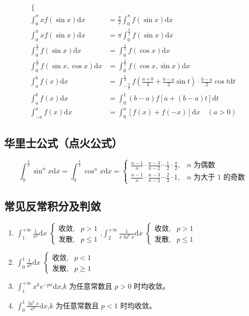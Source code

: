 \documentclass[UTF8]{ctexart}
\theoremstyle{remark}
\begin{document}
\begin{align}
\begin{cases}
			\end{cases}\\
			\int_{0}^{\pi} x f(\sin x)\mathrm{d}x&=\frac{\pi}{2}\int_{0}^{\pi} f(\sin x)\mathrm{d}x\\
			\int_{0}^{\pi} x f(\sin x)\mathrm{d}x&=\pi\int_{0}^{\frac{\pi}{2}} f(\sin x)\mathrm{d}x\\
			\int_{0}^{\frac{\pi}{2}} f(\sin x)\mathrm{d}x&=\int_{0}^{\frac{\pi}{2}} f(\cos x)\mathrm{d}x\\
			\int_{0}^{\frac{\pi}{2}} f(\sin x, \cos x)\mathrm{d}x&=\int_{0}^{\frac{\pi}{2}} f(\cos x, \sin x)\mathrm{d}x\\
			\int_{a}^{b} f(x)\mathrm{d}x&=\int_{-\frac{\pi}{2}}^{\frac{\pi}{2}} f\left(\frac{a + b}{2}+\frac{b - a}{2}\sin t\right)\cdot\frac{b - a}{2}\cos t\mathrm{d}t\\
			\int_{a}^{b} f(x)\mathrm{d}x&=\int_{0}^{1} (b - a)f[a+(b - a)t]\mathrm{d}t\\
			\int_{-a}^{a} f(x)\mathrm{d}x&=\int_{0}^{a} [f(x)+f(-x)]\mathrm{d}x\quad (a > 0)
		\end{align}
		
		\subsection{华里士公式（点火公式）}
		\[
		\int_{0}^{\frac{\pi}{2}} \sin^{n}x\mathrm{d}x = \int_{0}^{\frac{\pi}{2}} \cos^{n}x\mathrm{d}x = 
		\begin{cases}
			\frac{n - 1}{n}\cdot\frac{n - 3}{n - 2}\cdots\frac{1}{2}\cdot\frac{\pi}{2}, & n\text{ 为偶数}\\
			\frac{n - 1}{n}\cdot\frac{n - 3}{n - 2}\cdots\frac{2}{3}\cdot1, & n\text{ 为大于 }1\text{ 的奇数}
		\end{cases}
		\]
		
		\subsection{常见反常积分及判敛}
		\begin{enumerate}
			\item \(\int_{1}^{+\infty} \frac{1}{x^{p}}\mathrm{d}x\)
			\(\begin{cases}
				\text{收敛}, & p > 1\\
				\text{发散}, & p \leq 1
			\end{cases}\),\(\int_{2}^{+\infty} \frac{1}{x\ln^{p}x}\mathrm{d}x\)
			\(\begin{cases}
				\text{收敛}, & p > 1\\
				\text{发散}, & p \leq 1
			\end{cases}\)
			\item \(\int_{0}^{1} \frac{1}{x^{p}}\mathrm{d}x\)
			\(\begin{cases}
				\text{收敛}, & p < 1\\
				\text{发散}, & p \geq 1
			\end{cases}\)
			\item \(\int_{1}^{+\infty} x^{k}e^{-px}\mathrm{d}x\),\(k\) 为任意常数且 \(p > 0\) 时均收敛。
			\item \(\int_{0}^{1} \frac{\ln^{k}x}{x^{p}}\mathrm{d}x\),\(k\) 为任意常数且 \(p < 1\) 时均收敛。
		\end{enumerate}
		
\end{document}
